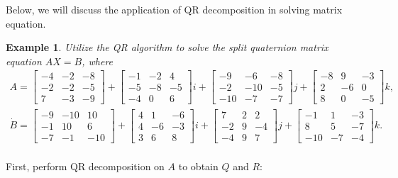 \documentclass[5p,10pt]{elsarticle}
\newtheorem{example}[theorem]{Example}
\numberwithin{equation}{section}
\begin{document}
Below, we will discuss the application of QR decomposition in solving matrix equation.
\begin{example}
Utilize the QR algorithm to solve the split quaternion matrix equation $AX = B$, where
\begin{align*}
A =
\begin{bmatrix}
-4 & -2 & -8 \\
-2 & -2 & -5 \\
7 & -3 & -9
\end{bmatrix} +
\begin{bmatrix}
-1 & -2 & 4 \\
-5 & -8 & -5 \\
-4 & 0 & 6
\end{bmatrix} i +
\begin{bmatrix}
-9 & -6 & -8 \\
-2 & -10 & -5 \\
-10 & -7 & -7
\end{bmatrix} j +
\begin{bmatrix}
-8 & 9 & -3 \\
2 & -6 & 0 \\
8 & 0 & -5
\end{bmatrix} k,
\\
\dot{B} =
\begin{bmatrix}
-9 & -10 & 10 \\
-1 & 10 & 6 \\
-7 & -1 & -10
\end{bmatrix} +
\begin{bmatrix}
4 & 1 & -6 \\
4 & -6 & -3 \\
3 & 6 & 8
\end{bmatrix} i +
\begin{bmatrix}
7 & 2 & 2 \\
-2 & 9 & -4 \\
-4 & 9 & 7
\end{bmatrix} j +
\begin{bmatrix}
-1 & 1 & -3 \\
8 & 5 & -7 \\
-10 & -7 & -4
\end{bmatrix} k.
\\
\end{align*}
\end{example}  
First, perform QR decomposition on $A$ to obtain $Q$ and $R:$
\end{document}
